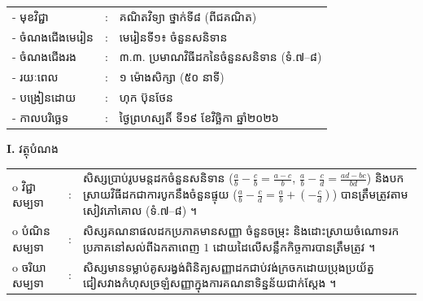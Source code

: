 \documentclass[a4paper,10pt]{article}
\newcommand{\wcirc}{{\CourierBullet\fontsize{9.5pt}{11pt}\selectfont o}}
\begin{document}
{\renewcommand{\arraystretch}{0.98}
\hspace*{3.1cm}%
\begin{tabular}{@{}l l L{11.0cm}@{}}
  - \hspace{0.35cm} មុខវិជ្ជា & : & គណិតវិទ្យា ថ្នាក់ទី៨ (ពីជគណិត) \\
  - \hspace{0.35cm} ចំណងជើងមេរៀន & : & មេរៀនទី១៖ ចំនួនសនិទាន \\
  - \hspace{0.35cm} ចំណងជើងរង & : & ៣.៣. ប្រមាណវិធីដកនៃចំនួនសនិទាន (ទំ.៧–៨) \\
  - \hspace{0.35cm} រយៈពេល & : & ១ ម៉ោងសិក្សា (៥០ នាទី) \\
  - \hspace{0.35cm} បង្រៀនដោយ & : & ហុក ប៊ុនថែន \\
  - \hspace{0.35cm} កាលបរិច្ឆេទ & : & ថ្ងៃព្រហស្បតិ៍ ទី១៩ ខែវិច្ឆិកា ឆ្នាំ២០២៦ \\
\end{tabular}

\vspace{2pt}

\textbf{I.} {\muol វត្ថុបំណង}\\[1pt]
\hspace*{0.55cm}%
\begin{tabular}{@{}l l L{14.2cm}@{}}
  \wcirc \hspace{0.25cm} វិជ្ជាសម្បទា & : & សិស្សប្រាប់រូបមន្តដកចំនួនសនិទាន ($\frac{a}{b}-\frac{c}{b}=\frac{a-c}{b}$, $\frac{a}{b}-\frac{c}{d}=\frac{ad-bc}{bd}$) និងបកស្រាយវិធីដកជាការបូកនឹងចំនួនផ្ទុយ ($\frac{a}{b}-\frac{c}{d}=\frac{a}{b}+\left(-\frac{c}{d}\right)$) បានត្រឹមត្រូវតាមសៀវភៅគោល (ទំ.៧–៨) ។ \\
  \wcirc \hspace{0.25cm} បំណិនសម្បទា & : & សិស្សគណនាផលដកប្រភាគមានសញ្ញា ចំនួនចម្រុះ និងដោះស្រាយចំណោទរកប្រភាគនៅសល់ពីឯកតាពេញ $1$ ដោយដៃលើសន្លឹកកិច្ចការបានត្រឹមត្រូវ ។ \\
  \wcirc \hspace{0.25cm} ចរិយាសម្បទា & : & សិស្សមានទម្លាប់គូសរង្វង់ពិនិត្យសញ្ញាដកជាប់វង់ក្រចកដោយប្រុងប្រយ័ត្ន ជៀសវាងកំហុសច្រឡំសញ្ញាក្នុងការគណនាទិន្នន័យជាក់ស្ដែង ។ \\
\end{tabular}

\vspace{2pt}

}
\end{document}

